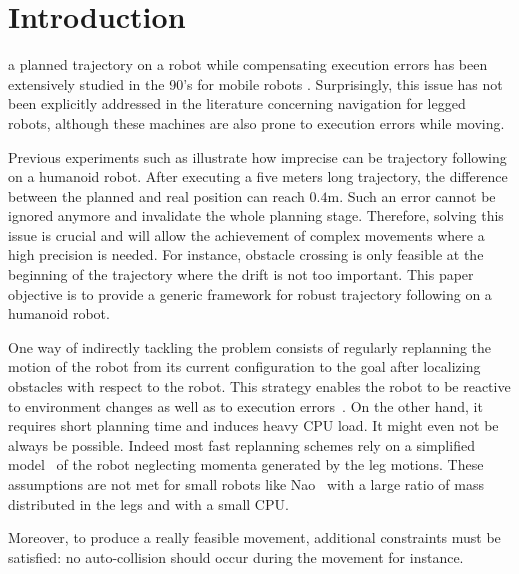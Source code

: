 \section{Introduction}

 a planned trajectory on a robot while
compensating execution errors has been extensively studied in the 90's
for mobile robots \cite{91icra.samson,
  98deLucaOrioloSamson}. Surprisingly, this issue has not been
explicitly addressed in the literature concerning navigation for
legged robots, although these machines are also prone to execution
errors while moving.

Previous experiments such as \cite{11humanoids.baudouin} illustrate
how imprecise can be trajectory following on a humanoid robot. After
executing a five meters long trajectory, the difference between the
planned and real position can reach $0.4 \textrm{m}$. Such an error
cannot be ignored anymore and invalidate the whole planning
stage. Therefore, solving this issue is crucial and will allow the
achievement of complex movements where a high precision is needed. For
instance, obstacle crossing is only feasible at the beginning of the
trajectory where the drift is not too important. This paper objective
is to provide a generic framework for robust trajectory following on a
humanoid robot.

One way of indirectly tackling the problem consists of regularly
replanning the motion of the robot from its current configuration to
the goal after localizing obstacles with respect to the robot. This
strategy enables the robot to be reactive to environment changes as
well as to execution errors~\cite{05humanoids.michel,
  06icra.MichelChestnut,10springer.chestnut}. On the other hand, it
requires short planning time and induces heavy CPU load. It might even
not be always be possible. Indeed most fast replanning schemes rely on
a simplified model~\cite{01icra.KajitaKanehiro} of the robot
neglecting momenta generated by the leg motions. These assumptions are
not met for small robots like Nao~\cite{wikipedia.nao} with a large
ratio of mass distributed in the legs and with a small CPU.

Moreover, to produce a really feasible movement, additional
constraints must be satisfied: no auto-collision should occur during
the movement for instance.


